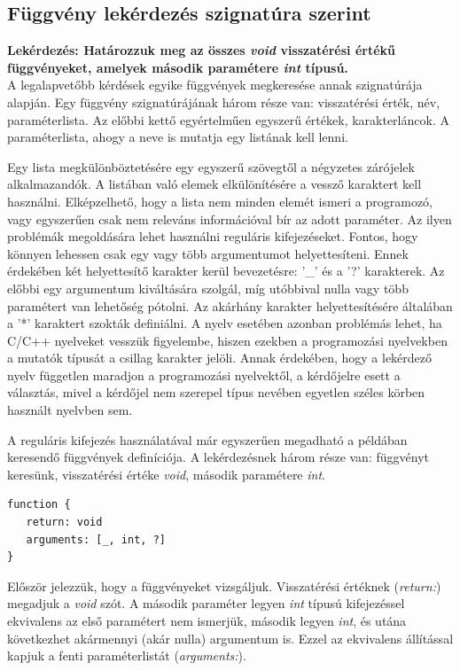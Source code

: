 \documentclass[a4paper,12pt]{report}
\begin{document}
\subsection{Függvény lekérdezés szignatúra szerint}
\textbf{Lekérdezés: Határozzuk meg az összes \textit{void} visszatérési értékű függvényeket, amelyek második paramétere \textit{int} típusú.}
\\
A legalapvetőbb kérdések egyike függvények megkeresése annak szignatúrája alapján. Egy függvény szignatúrájának három része van: visszatérési érték, név, paraméterlista. Az előbbi kettő egyértelműen egyszerű értékek, karakterláncok. A paraméterlista, ahogy a neve is mutatja egy listának kell lenni. 
\par Egy lista megkülönböztetésére egy egyszerű szövegtől a négyzetes zárójelek alkalmazandók. A listában való elemek elkülönítésére a vessző karaktert kell használni. Elképzelhető, hogy a lista nem minden elemét ismeri a programozó, vagy egyszerűen csak nem releváns információval bír az adott paraméter. Az ilyen problémák megoldására lehet használni reguláris kifejezéseket. Fontos, hogy könnyen lehessen csak egy vagy több argumentumot helyettesíteni. Ennek érdekében két helyettesítő karakter kerül bevezetésre: '\_' és a '?' karakterek. Az előbbi egy argumentum kiváltására szolgál, míg utóbbival nulla vagy több paramétert van lehetőség pótolni. Az akárhány karakter helyettesítésére általában a '*' karaktert szokták definiálni. A nyelv esetében azonban problémás lehet, ha C/C++ nyelveket vesszük figyelembe, hiszen ezekben a programozási nyelvekben a mutatók típusát a csillag karakter jelöli. Annak érdekében, hogy a lekérdező nyelv független maradjon a programozási nyelvektől, a kérdőjelre esett a választás, mivel a kérdőjel nem szerepel típus nevében egyetlen széles körben használt nyelvben sem.
\par A reguláris kifejezés használatával már egyszerűen megadható a példában keresendő függvények definíciója. A lekérdezésnek három része van: függvényt keresünk, visszatérési értéke \textit{void}, második paramétere \textit{int}.
\begin{verbatim}
function {
   return: void
   arguments: [_, int, ?]
}
\end{verbatim}
\par Először jelezzük, hogy a függvényeket vizsgáljuk. Visszatérési értéknek (\textit{return:}) megadjuk a \textit{void} szót. A második paraméter legyen \textit{int} típusú kifejezéssel ekvivalens az első paramétert nem ismerjük, második legyen \textit{int}, és utána következhet akármennyi (akár nulla) argumentum is. Ezzel az ekvivalens állítással kapjuk a fenti paraméterlistát (\textit{arguments:}).
\end{document}
